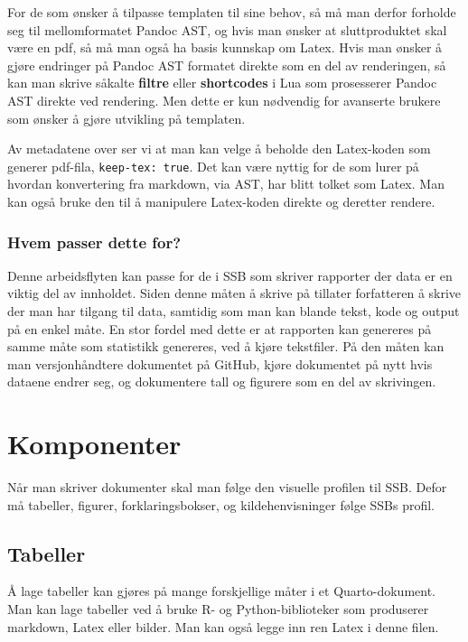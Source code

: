 \documentclass[
  10pt,
]{scrartcl}
\begin{document}
For de som ønsker å tilpasse templaten til sine behov, så må man derfor
forholde seg til mellomformatet Pandoc AST, og hvis man ønsker at
sluttproduktet skal være en pdf, så må man også ha basis kunnskap om
Latex. Hvis man ønsker å gjøre endringer på Pandoc AST formatet direkte
som en del av renderingen, så kan man skrive såkalte \textbf{filtre}
eller \textbf{shortcodes} i Lua som prosesserer Pandoc AST direkte ved
rendering. Men dette er kun nødvendig for avanserte brukere som ønsker å
gjøre utvikling på templaten.

Av metadatene over ser vi at man kan velge å beholde den Latex-koden som
generer pdf-fila, \texttt{keep-tex:\ true}. Det kan være nyttig for de
som lurer på hvordan konvertering fra markdown, via AST, har blitt
tolket som Latex. Man kan også bruke den til å manipulere Latex-koden
direkte og deretter rendere.

\subsubsection{Hvem passer dette for?}\label{hvem-passer-dette-for}

Denne arbeidsflyten kan passe for de i SSB som skriver rapporter der
data er en viktig del av innholdet. Siden denne måten å skrive på
tillater forfatteren å skrive der man har tilgang til data, samtidig som
man kan blande tekst, kode og output på en enkel måte. En stor fordel
med dette er at rapporten kan genereres på samme måte som statistikk
genereres, ved å kjøre tekstfiler. På den måten kan man versjonhåndtere
dokumentet på GitHub, kjøre dokumentet på nytt hvis dataene endrer seg,
og dokumentere tall og figurere som en del av skrivingen.

\section{Komponenter}\label{komponenter}

Når man skriver dokumenter skal man følge den visuelle profilen til SSB.
Defor må tabeller, figurer, forklaringsbokser, og kildehenvisninger
følge SSBs profil.

\subsection{Tabeller}\label{tabeller}

Å lage tabeller kan gjøres på mange forskjellige måter i et
Quarto-dokument. Man kan lage tabeller ved å bruke R- og
Python-biblioteker som produserer markdown, Latex eller bilder. Man kan
også legge inn ren Latex i denne filen.
\end{document}
